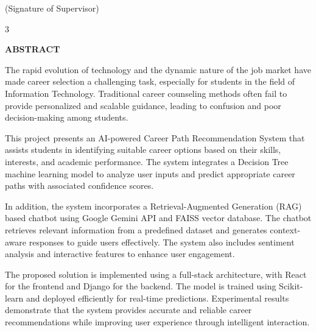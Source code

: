 \documentclass[12pt,a4paper]{report}
\begin{document}
\vspace{2cm}

\begin{flushright}
(Signature of Supervisor)
\end{flushright}

\vfill

\begin{center}
3
\end{center}

\newpage


\clearpage
\thispagestyle{empty}

\begin{center}
    {\Large \textbf{ABSTRACT}}\\[0.3cm]
\end{center}

\vspace{0.8cm}

\noindent
\setlength{\parindent}{0pt}
\justifying
The rapid evolution of technology and the dynamic nature of the job market have made career selection a challenging task, especially for students in the field of Information Technology. Traditional career counseling methods often fail to provide personalized and scalable guidance, leading to confusion and poor decision-making among students.

\vspace{0.3cm}
\noindent
This project presents an AI-powered Career Path Recommendation System that assists students in identifying suitable career options based on their skills, interests, and academic performance. The system integrates a Decision Tree machine learning model to analyze user inputs and predict appropriate career paths with associated confidence scores.

\vspace{0.3cm}
\noindent
In addition, the system incorporates a Retrieval-Augmented Generation (RAG) based chatbot using Google Gemini API and FAISS vector database. The chatbot retrieves relevant information from a predefined dataset and generates context-aware responses to guide users effectively. The system also includes sentiment analysis and interactive features to enhance user engagement.

\vspace{0.3cm}
\noindent
The proposed solution is implemented using a full-stack architecture, with React for the frontend and Django for the backend. The model is trained using Scikit-learn and deployed efficiently for real-time predictions. Experimental results demonstrate that the system provides accurate and reliable career recommendations while improving user experience through intelligent interaction.
\end{document}
